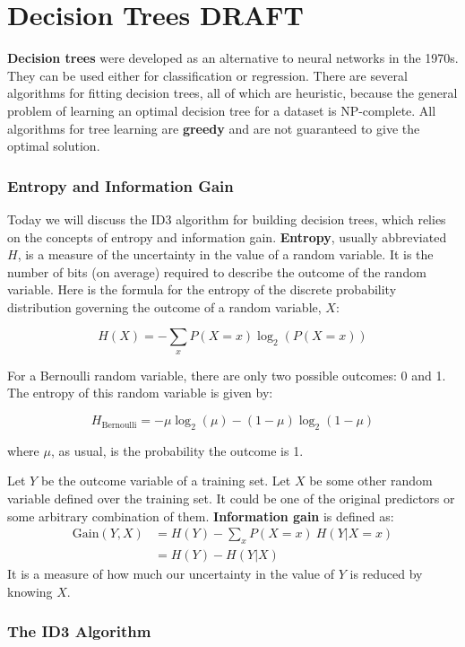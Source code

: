 \chapter{Decision Trees {\color{red} DRAFT} \label{chapter:decisiontrees}}

{\bf Decision trees} were developed as an alternative to neural networks in the 1970s. They can be used either for classification or regression. There are several algorithms for fitting decision trees, all of which are heuristic, because the general problem of learning an optimal decision tree for a dataset is NP-complete. All algorithms for tree learning are \textbf{greedy} and are not guaranteed to give the optimal solution.

\subsection{Entropy and Information Gain}

Today we will discuss the ID3 algorithm for building decision trees, which relies on the concepts of entropy and information gain. \textbf{Entropy}, usually abbreviated $H$, is a measure of the uncertainty in the value of a random variable. It is the number of bits (on average) required to describe the outcome of the random variable. Here is the formula for the entropy of the discrete probability distribution governing the outcome of a random variable, $X$:

$$ H(X) = - \sum_{x} P(X = x) \log_2\left(P(X = x)\right) $$

For a Bernoulli random variable, there are only two possible outcomes: 0 and 1. The entropy of this random variable is given by:

$$ H_\text{Bernoulli} = -\mu \log_2(\mu) - (1 - \mu) \log_2 (1 - \mu) $$

where $\mu$, as usual, is the probability the outcome is 1. 

Let $Y$ be the outcome variable of a training set. Let $X$ be some other random variable defined over the training set. It could be one of the original predictors or some arbitrary combination of them. \textbf{Information gain} is defined as:
\begin{align*} \text{Gain}(Y, X) &= H(Y) - \sum_{x} P(X = x)~ H(Y|X=x) \\
&= H(Y) - H(Y|X) \end{align*}
It is a measure of how much our uncertainty in the value of $Y$ is reduced by knowing $X$. 

\subsection{The ID3 Algorithm}

